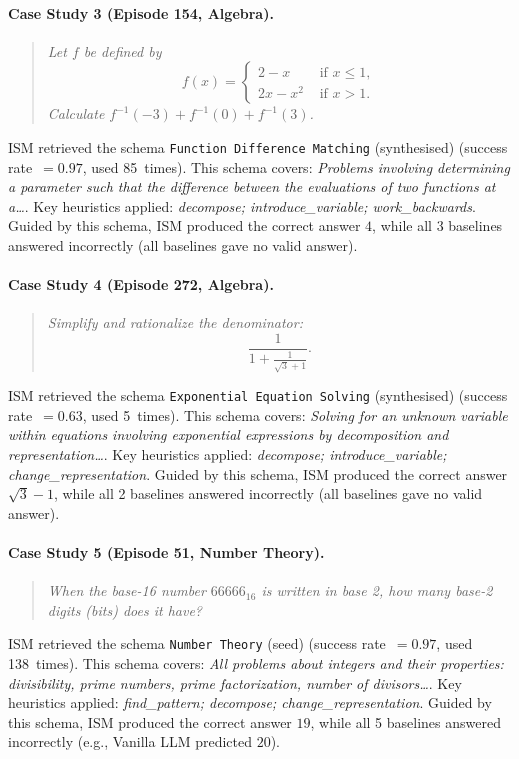 \paragraph{Case Study 3 (Episode 154, Algebra).}
\begin{quote}\itshape
Let $f$ be defined by  \[f(x) = \left\{
\begin{array}{cl}
2-x & \text{ if } x \leq 1, \\
2x-x^2 & \text{ if } x>1.
\end{array}
\right.\]Calculate $f^{-1}(-3)+f^{-1}(0)+f^{-1}(3)$.
\end{quote}

ISM retrieved the schema \texttt{Function Difference Matching} (synthesised) (success rate~$=0.97$, used 85~times). 
This schema covers: \textit{Problems involving determining a parameter such that the difference between the evaluations of two functions at a\ldots}. 
Key heuristics applied: \textit{decompose; introduce_variable; work_backwards}. 
Guided by this schema, ISM produced the correct answer $\boxed{4}$, while all 3 baselines answered incorrectly (all baselines gave no valid answer). 

\paragraph{Case Study 4 (Episode 272, Algebra).}
\begin{quote}\itshape
Simplify and rationalize the denominator: \[
\frac{1}{1+ \frac{1}{\sqrt{3}+1}}.
\]
\end{quote}

ISM retrieved the schema \texttt{Exponential Equation Solving} (synthesised) (success rate~$=0.63$, used 5~times). 
This schema covers: \textit{Solving for an unknown variable within equations involving exponential expressions by decomposition and representation\ldots}. 
Key heuristics applied: \textit{decompose; introduce_variable; change_representation}. 
Guided by this schema, ISM produced the correct answer $\boxed{\sqrt{3} - 1}$, while all 2 baselines answered incorrectly (all baselines gave no valid answer). 

\paragraph{Case Study 5 (Episode 51, Number Theory).}
\begin{quote}\itshape
When the base-16 number $66666_{16}$ is written in base 2, how many base-2 digits (bits) does it have?
\end{quote}

ISM retrieved the schema \texttt{Number Theory} (seed) (success rate~$=0.97$, used 138~times). 
This schema covers: \textit{All problems about integers and their properties: divisibility, prime numbers, prime factorization, number of divisors\ldots}. 
Key heuristics applied: \textit{find_pattern; decompose; change_representation}. 
Guided by this schema, ISM produced the correct answer $\boxed{19}$, while all 5 baselines answered incorrectly (e.g., Vanilla LLM predicted $20$). 
